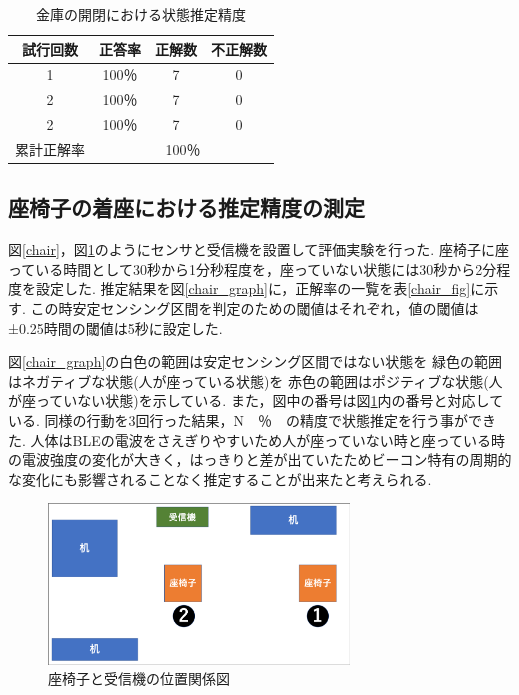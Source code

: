 \documentclass[Japanese]{dicomopapers}
\begin{document}
\begin{table}[htb]
    \begin{center}
        \caption{金庫の開閉における状態推定精度}
        \label{kinko_fig}
        \begin{tabular}{|c|c|c|c|} \hline
        試行回数 & 正答率 & 正解数 & 不正解数 \\ \hline
        1 & 100％ & 7 & 0 \\ \hline
        2 & 100％ & 7 & 0 \\ \hline
        2 & 100％ & 7 & 0 \\ \hline \hline
        累計正解率 & \multicolumn{3}{c|}{100％} \\ \hline
        \end{tabular}
    \end{center}
\end{table}



\subsection{座椅子の着座における推定精度の測定}

図\ref{chair}，図\ref{zaisu_position}のようにセンサと受信機を設置して評価実験を行った.
座椅子に座っている時間として30秒から1分秒程度を，座っていない状態には30秒から2分程度を設定した.
推定結果を図\ref{chair_graph}に，正解率の一覧を表\ref{chair_fig}に示す.
この時安定センシング区間を判定のための閾値はそれぞれ，値の閾値は±0.25時間の閾値は5秒に設定した.

図\ref{chair_graph}の白色の範囲は安定センシング区間ではない状態を 緑色の範囲はネガティブな状態(人が座っている状態)を 赤色の範囲はポジティブな状態(人が座っていない状態)を示している.
また，図中の番号は図\ref{zaisu_position}内の番号と対応している.
同様の行動を3回行った結果，N　％　の精度で状態推定を行う事ができた.
人体はBLEの電波をさえぎりやすいため人が座っていない時と座っている時の電波強度の変化が大きく，はっきりと差が出ていたためビーコン特有の周期的な変化にも影響されることなく推定することが出来たと考えられる.



\begin{figure}[ht]
    \centering
    \includegraphics[width=8cm]{zaisu_position.png}
    \caption{座椅子と受信機の位置関係図}
    \label{zaisu_position}
\end{figure}
\end{document}
